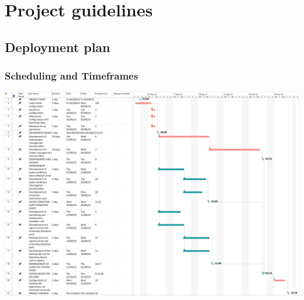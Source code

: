 \section{Project guidelines}
\subsection{Deployment plan}
\subsubsection{Scheduling and Timeframes}
   
\begin{center}
    \includegraphics{img/gantt.png}
\end{center}
